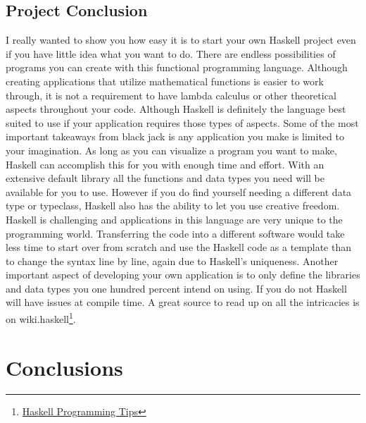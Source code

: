 \documentclass{article}
\begin{document}
    \subsection{Project Conclusion}
    I really wanted to show you how easy it is to start your own Haskell project even if you have little idea what you want to do. There are endless possibilities of programs you can create with this functional programming language. Although creating applications that utilize mathematical functions is easier to work through, it is not a requirement to have lambda calculus or other theoretical aspects throughout your code. Although Haskell is definitely the language best suited to use if your application requires those types of aspects. Some of the most important takeaways from black jack is any application you make is limited to your imagination. As long as you can visualize a program you want to make, Haskell can accomplish this for you with enough time and effort. With an extensive default library all the functions and data types you need will be available for you to use. However if you do find yourself needing a different data type or typeclass, Haskell also has the ability to let you use creative freedom. Haskell is challenging and applications in this language are very unique to the programming world. Transferring the code into a different software would take less time to start over from scratch and use the Haskell code as a template than to change the syntax line by line, again due to Haskell's uniqueness. Another important aspect of developing your own application is to only define the libraries and data types you one hundred percent intend on using. If you do not Haskell will have issues at compile time. A great source to read up on all the intricacies is on wiki.haskell\footnote{\href{https://wiki.haskell.org/Haskell_programming_tips}{Haskell Programming Tips}}.
    
\section{Conclusions}\label{conclusions}
\end{document}
